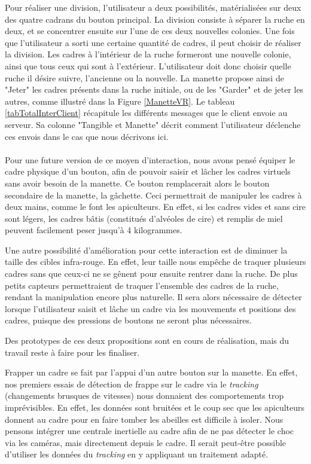 		Pour réaliser une division, l'utilisateur a deux possibilités, matérialisées sur deux des quatre cadrans du bouton principal. La division consiste à séparer la ruche en deux, et se concentrer ensuite sur l'une de ces deux nouvelles colonies. Une fois que l'utilisateur a sorti une certaine quantité de cadres, il peut choisir de réaliser la division. Les cadres à l'intérieur de la ruche formeront une nouvelle colonie, ainsi que tous ceux qui sont à l'extérieur. L'utilisateur doit donc choisir quelle ruche il désire suivre, l'ancienne ou la nouvelle. La manette propose ainsi de "Jeter" les cadres présents dans la ruche initiale, ou de les "Garder" et de jeter les autres, comme illustré dans la Figure \ref{ManetteVR}. Le tableau \ref{tabTotalInterClient} récapitule les différents messages que le client envoie au serveur. Sa colonne "Tangible et Manette" décrit comment l'utilisateur déclenche ces envois dans le cas que nous décrivons ici.

		\paragraph{}		
		Pour une future version de ce moyen d'interaction, nous avons pensé équiper le cadre physique d'un bouton, afin de pouvoir saisir et lâcher les cadres virtuels sans avoir besoin de la manette. Ce bouton remplacerait alors le bouton secondaire de la manette, la gâchette. Ceci permettrait de manipuler les cadres à deux mains, comme le font les apiculteurs. En effet, si les cadres vides et sans cire sont légers, les cadres bâtis (constitués d'alvéoles de cire) et remplis de miel peuvent facilement peser jusqu'à 4 kilogrammes.
		
		Une autre possibilité d'amélioration pour cette interaction est de diminuer la taille des cibles infra-rouge. En effet, leur taille nous empêche de traquer plusieurs cadres sans que ceux-ci ne se gênent pour ensuite rentrer dans la ruche. De plus petits capteurs permettraient de traquer l'ensemble des cadres de la ruche, rendant la manipulation encore plus naturelle. Il sera alors nécessaire de détecter lorsque l'utilisateur saisit et lâche un cadre via les mouvements et positions des cadres, puisque des pressions de boutons ne seront plus nécessaires.
		
		Des prototypes de ces deux propositions sont en cours de réalisation, mais du travail reste à faire pour les finaliser.
		
		Frapper un cadre se fait par l'appui d'un autre bouton sur la manette. En effet, nos premiers essais de détection de frappe sur le cadre via le \textit{tracking} (changements brusques de vitesses) nous donnaient des comportements trop imprévisibles. En effet, les données sont bruitées et le coup sec que les apiculteurs donnent au cadre pour en faire tomber les abeilles est difficile à isoler. Nous pensons intégrer une centrale inertielle au cadre afin de ne pas détecter le choc via les caméras, mais directement depuis le cadre. Il serait peut-être possible d'utiliser les données du \textit{tracking} en y appliquant un traitement adapté.
		
